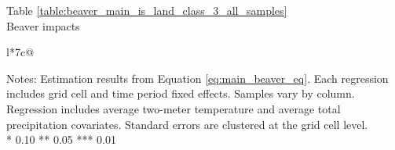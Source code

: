 \begin{table}[htb]
\captionlistentry[table]{}
\label{table:beaver_main_is_land_class_3_all_samples}
\centering
Table \ref{table:beaver_main_is_land_class_3_all_samples} \\
Beaver impacts \\
\begin{threeparttable}
\begin{tabulary}{\textwidth}{l*{7}{c}@{}}
\toprule \toprule
\noalign{\smallskip}
\noalign{\smallskip}
\midrule \bottomrule
\end{tabulary}
\medskip
\begin{tablenotes}[flushleft]
\setlength{}
\item
\footnotesize
\justify
Notes: Estimation results from Equation \eqref{eq:main_beaver_eq}.
Each regression includes grid cell and time period fixed effects.
Samples vary by column. Regression includes average two-meter temperature and average total precipitation covariates.
Standard errors are clustered at the grid cell level. \\
\mbox{*} 0.10 ** 0.05 *** 0.01
\end{tablenotes}
\end{threeparttable}
\end{table}
